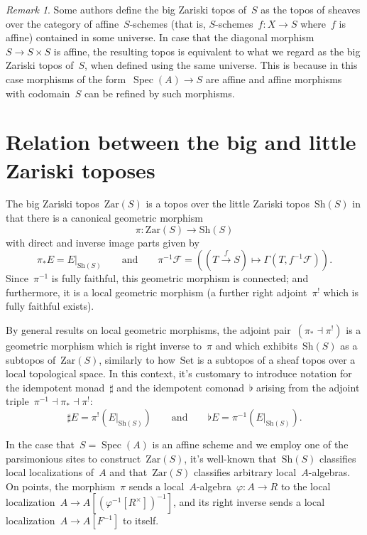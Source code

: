 \documentclass[10pt,reqno,a4paper]{amsbook}
\theoremstyle{definition}
\theoremstyle{plain}
\theoremstyle{remark}
\newtheorem{rem}[defn]{Remark}
\newcommand{\F}{\mathcal{F}}
\newcommand{\Set}{\mathrm{Set}}
\newcommand{\Sh}{\mathrm{Sh}}
\newcommand{\Zar}{\mathrm{Zar}}
\DeclareMathOperator{\Spec}{Spec}
\newcommand{\?}{\,{:}\,}
\renewcommand{\_}{\mathpunct{.}\,}
\newcommand{\xra}{\xrightarrow}
\begin{document}
{\begin{rem}Some authors define the big Zariski topos of~$S$ as the topos of
sheaves over the category of affine~$S$-schemes (that is, $S$-schemes~$f : X
\to S$ where~$f$ is affine) contained in some universe. In case that the
diagonal morphism~$S \to S \times S$ is affine, the resulting topos is
equivalent to what we regard as the big Zariski topos of~$S$, when defined using the
same universe. This is because in this case morphisms of the form~$\Spec(A) \to
S$ are affine and affine morphisms with codomain~$S$ can be refined by such
morphisms.
\end{rem}

}


\section{Relation between the big and little Zariski toposes}
\label{sect:relation-big-little}

The big Zariski topos~$\Zar(S)$ is a topos over the little Zariski
topos~$\Sh(S)$ in that there is a canonical geometric morphism
\[ \pi : \Zar(S) \longrightarrow \Sh(S) \]
with direct and inverse image parts given by
\[ \pi_*E = E|_{\Sh(S)} \qquad\text{and}\qquad
  \pi^{-1}\F = ((T \xra{f} S) \mapsto \Gamma(T, f^{-1}\F)). \]
Since~$\pi^{-1}$ is fully faithful, this geometric morphism is connected; and
furthermore, it is a local geometric morphism (a further right adjoint~$\pi^!$
which is fully faithful exists).

By general results on local geometric morphisms, the adjoint pair~$(\pi_*
\dashv \pi^!)$ is a geometric morphism which is right inverse to~$\pi$ and
which exhibits~$\Sh(S)$ as a subtopos of~$\Zar(S)$, similarly to how~$\Set$ is
a subtopos of a sheaf topos over a local topological space. In this context,
it's customary to introduce notation for the idempotent monad~$\sharp$ and the
idempotent comonad~$\flat$ arising from the adjoint triple~$\pi^{-1} \dashv
\pi_* \dashv \pi^!$:
\[ \sharp E = \pi^!(E|_{\Sh(S)}) \qquad\text{and}\qquad
  \flat E = \pi^{-1}(E|_{\Sh(S)}). \]

In the case that~$S = \Spec(A)$ is an affine scheme and we employ
one of the parsimonious sites to construct~$\Zar(S)$, it's well-known
that~$\Sh(S)$ classifies local localizations of~$A$ and that~$\Zar(S)$ classifies
arbitrary local~$A$-algebras. On points, the morphism~$\pi$ sends a
local~$A$-algebra~$\varphi : A \to R$ to the local localization~$A \to
A[(\varphi^{-1}[R^\times])^{-1}]$, and its right inverse sends a local
localization~$A \to A[F^{-1}]$ to itself.
\end{document}

